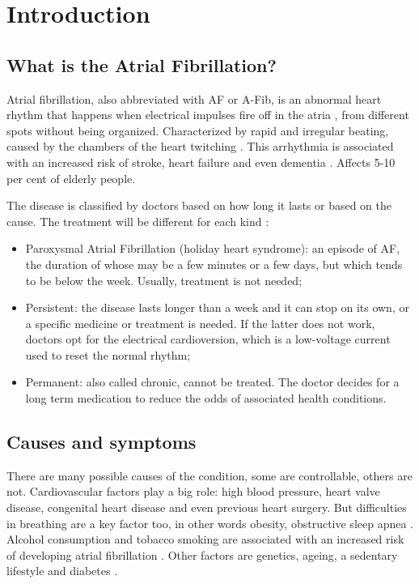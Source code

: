 \chapter{Introduction}
\label{sec:introduction}

\section{What is the Atrial Fibrillation?}
Atrial fibrillation, also abbreviated with AF or A-Fib, is an abnormal heart rhythm that happens when electrical impulses fire off in the atria , from different spots without being organized. Characterized by rapid and irregular beating, 	caused by the chambers of the heart twitching \cite{cdcgov17}. This arrhythmia is associated with an increased risk of stroke, heart failure and even dementia \cite{10.1001/archinte.1987.00370090041008, Munger2014}. Affects 5-10 per cent of elderly people.


The disease is classified by doctors based on how long it lasts or based on the cause. The treatment will be different for each kind \cite{webmd2018}:
\begin{itemize}
  \item Paroxysmal Atrial Fibrillation (holiday heart syndrome): an episode of AF, the duration of whose may be a few minutes or a few days, but which tends to be below the week. Usually, treatment is not needed;
  \item Persistent: the disease lasts longer than a week and it can stop on its own, or a specific medicine or treatment is needed. If the latter does not work, doctors opt for the electrical cardioversion, which is a low-voltage current used to reset the normal rhythm;
  \item Permanent: also called chronic, cannot be treated. The doctor decides for a long term medication to reduce the odds of associated health conditions.
\end{itemize}

\section{Causes and symptoms}
There are many possible causes of the condition, some are controllable, others are not. Cardiovascular factors play a big role: high blood pressure, heart valve disease, congenital heart disease and even previous heart surgery. But difficulties in breathing are a key factor too, in other words obesity, obstructive sleep apnea \cite{doi:10.1111/obr.12056}. Alcohol consumption and tobacco smoking are associated with an increased risk of developing atrial fibrillation \cite{Tonelo2013, DU20171968}. Other factors are genetics, ageing, a sedentary lifestyle and diabetes \cite{10.1001/jama.291.23.2851, Staerk2017}.

